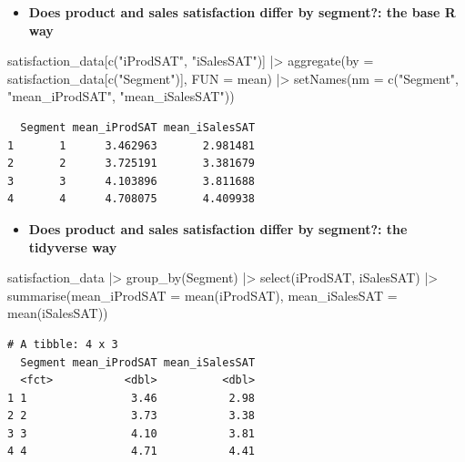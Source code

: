 \documentclass[
  ignorenonframetext,
]{beamer}
\newenvironment{Shaded}{\begin{snugshade}}{\end{snugshade}}
\newcommand{\AttributeTok}[1]{\textcolor[rgb]{0.40,0.45,0.13}{#1}}
\newcommand{\FunctionTok}[1]{\textcolor[rgb]{0.28,0.35,0.67}{#1}}
\newcommand{\NormalTok}[1]{\textcolor[rgb]{0.00,0.23,0.31}{#1}}
\newcommand{\SpecialCharTok}[1]{\textcolor[rgb]{0.37,0.37,0.37}{#1}}
\newcommand{\StringTok}[1]{\textcolor[rgb]{0.13,0.47,0.30}{#1}}
\providecommand{\tightlist}{%
  \setlength{\itemsep}{0pt}\setlength{\parskip}{0pt}}\usepackage{longtable,booktabs,array}
\begin{document}
\begin{frame}[fragile]{}
\label{section-16}
\scriptsize

\begin{itemize}
\tightlist
\item
  \textbf{Does product and sales satisfaction differ by segment?: the
  base R way}
\end{itemize}

\tiny

\begin{Shaded}
\begin{Highlighting}[]
\NormalTok{satisfaction\_data[}\FunctionTok{c}\NormalTok{(}\StringTok{"iProdSAT"}\NormalTok{, }\StringTok{"iSalesSAT"}\NormalTok{)] }\SpecialCharTok{|\textgreater{}} 
  \FunctionTok{aggregate}\NormalTok{(}\AttributeTok{by =}\NormalTok{ satisfaction\_data[}\FunctionTok{c}\NormalTok{(}\StringTok{"Segment"}\NormalTok{)], }\AttributeTok{FUN =}\NormalTok{ mean) }\SpecialCharTok{|\textgreater{}}
  \FunctionTok{setNames}\NormalTok{(}\AttributeTok{nm =} \FunctionTok{c}\NormalTok{(}\StringTok{"Segment"}\NormalTok{, }\StringTok{"mean\_iProdSAT"}\NormalTok{, }\StringTok{"mean\_iSalesSAT"}\NormalTok{))}
\end{Highlighting}
\end{Shaded}

\begin{verbatim}
  Segment mean_iProdSAT mean_iSalesSAT
1       1      3.462963       2.981481
2       2      3.725191       3.381679
3       3      4.103896       3.811688
4       4      4.708075       4.409938
\end{verbatim}

\scriptsize

\begin{itemize}
\tightlist
\item
  \textbf{Does product and sales satisfaction differ by segment?: the
  tidyverse way}
\end{itemize}

\tiny

\begin{Shaded}
\begin{Highlighting}[]
\NormalTok{satisfaction\_data }\SpecialCharTok{|\textgreater{}}
  \FunctionTok{group\_by}\NormalTok{(Segment) }\SpecialCharTok{|\textgreater{}} 
  \FunctionTok{select}\NormalTok{(iProdSAT, iSalesSAT) }\SpecialCharTok{|\textgreater{}}
  \FunctionTok{summarise}\NormalTok{(}\AttributeTok{mean\_iProdSAT =} \FunctionTok{mean}\NormalTok{(iProdSAT), }\AttributeTok{mean\_iSalesSAT =} \FunctionTok{mean}\NormalTok{(iSalesSAT))}
\end{Highlighting}
\end{Shaded}

\begin{verbatim}
# A tibble: 4 x 3
  Segment mean_iProdSAT mean_iSalesSAT
  <fct>           <dbl>          <dbl>
1 1                3.46           2.98
2 2                3.73           3.38
3 3                4.10           3.81
4 4                4.71           4.41
\end{verbatim}
\end{frame}
\end{document}
